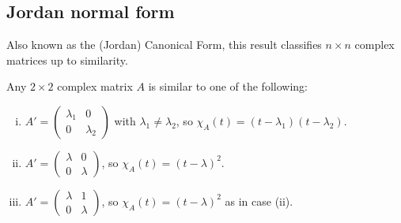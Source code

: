 \subsection{Jordan normal form}
Also known as the (Jordan) Canonical Form, this result classifies \(n\times n\) complex matrices up to similarity.
\begin{proposition}
	Any \(2\times 2\) complex matrix \(A\) is similar to one of the following:
	\begin{enumerate}[(i)]
		\item \(A' = \begin{pmatrix}
			      \lambda_1 & 0         \\
			      0         & \lambda_2
		      \end{pmatrix}\) with \(\lambda_1 \neq \lambda_2\), so \(\chi_A(t) = (t - \lambda_1)(t - \lambda_2)\).
		\item \(A' = \begin{pmatrix}
			      \lambda & 0       \\
			      0       & \lambda
		      \end{pmatrix}\), so \(\chi_A(t) = (t - \lambda)^2\).
		\item \(A' = \begin{pmatrix}
			      \lambda & 1       \\
			      0       & \lambda
		      \end{pmatrix}\), so \(\chi_A(t) = (t - \lambda)^2\) as in case (ii).
	\end{enumerate}
\end{proposition}
